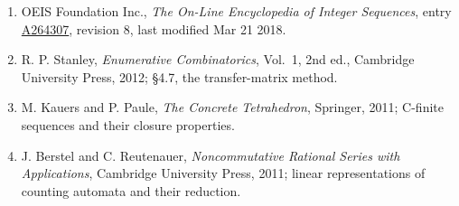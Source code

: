 \documentclass[11pt]{article}
\theoremstyle{definition}
\begin{document}
\begin{enumerate}

\item OEIS Foundation Inc., \emph{The On-Line Encyclopedia of Integer Sequences}, entry \href{https://oeis.org/A264307}{A264307}, revision 8, last modified Mar 21 2018.

\item R. P. Stanley, \emph{Enumerative Combinatorics}, Vol.~1, 2nd ed., Cambridge University Press, 2012; \S4.7, the transfer-matrix method.

\item M. Kauers and P. Paule, \emph{The Concrete Tetrahedron}, Springer, 2011; C-finite sequences and their closure properties.

\item J. Berstel and C. Reutenauer, \emph{Noncommutative Rational Series with Applications}, Cambridge University Press, 2011; linear representations of counting automata and their reduction.

\end{enumerate}
\end{document}
